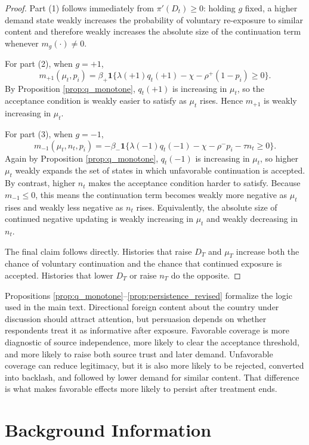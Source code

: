 \documentclass[12pt,american]{article}
\begin{document}
\begin{refsection}
\begin{proof}
			Part (1) follows immediately from \(\pi'(D_t)\ge 0\): holding \(g\) fixed, a higher demand state weakly increases the probability of voluntary re-exposure to similar content and therefore weakly increases the absolute size of the continuation term whenever \(m_g(\cdot)\neq 0\).
			
			For part (2), when \(g=+1\),
			\[
			m_{+1}(\mu_t,p_i)=\beta_+\mathbf{1}\{\lambda(+1)q_t(+1)-\chi-\rho^+(1-p_i)\ge 0\}.
			\]
			By Proposition \ref{prop:q_monotone}, \(q_t(+1)\) is increasing in \(\mu_t\), so the acceptance condition is weakly easier to satisfy as \(\mu_t\) rises. Hence \(m_{+1}\) is weakly increasing in \(\mu_t\).
			
			For part (3), when \(g=-1\),
			\[
			m_{-1}(\mu_t,n_t,p_i)=-\beta_-\mathbf{1}\{\lambda(-1)q_t(-1)-\chi-\rho^-p_i-\tau n_t\ge 0\}.
			\]
			Again by Proposition \ref{prop:q_monotone}, \(q_t(-1)\) is increasing in \(\mu_t\), so higher \(\mu_t\) weakly expands the set of states in which unfavorable continuation is accepted. By contrast, higher \(n_t\) makes the acceptance condition harder to satisfy. Because \(m_{-1}\le 0\), this means the continuation term becomes weakly more negative as \(\mu_t\) rises and weakly less negative as \(n_t\) rises. Equivalently, the absolute size of continued negative updating is weakly increasing in \(\mu_t\) and weakly decreasing in \(n_t\).
			
			The final claim follows directly. Histories that raise \(D_T\) and \(\mu_T\) increase both the chance of voluntary continuation and the chance that continued exposure is accepted. Histories that lower \(D_T\) or raise \(n_T\) do the opposite.
		\end{proof}
		
		Propositions \ref{prop:q_monotone}--\ref{prop:persistence_revised} formalize the logic used in the main text. Directional foreign content about the country under discussion should attract attention, but persuasion depends on whether respondents treat it as informative after exposure. Favorable coverage is more diagnostic of source independence, more likely to clear the acceptance threshold, and more likely to raise both source trust and later demand. Unfavorable coverage can reduce legitimacy, but it is also more likely to be rejected, converted into backlash, and followed by lower demand for similar content. That difference is what makes favorable effects more likely to persist after treatment ends.
		
		\section{Background Information}
		\label{app:background_information}


\end{refsection}
\end{document}
